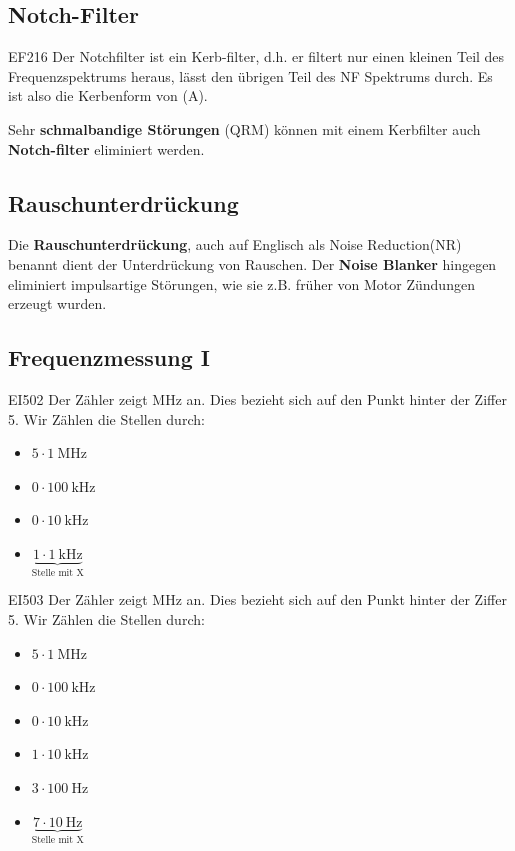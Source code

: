 \subsection{Notch-Filter}
\begin{sol}{EF216}
Der Notchfilter ist ein Kerb-filter, d.h. er filtert nur einen kleinen Teil des Frequenzspektrums heraus, lässt den übrigen Teil des NF Spektrums durch. Es ist also die Kerbenform von (A).
\end{sol} 
\begin{ohmchapter}
Sehr \textbf{schmalbandige Störungen} (QRM) können mit einem Kerbfilter auch \textbf{Notch-filter} eliminiert werden.
\end{ohmchapter}



\subsection{Rauschunterdrückung}
\begin{ohmchapter}
  Die \textbf{Rauschunterdrückung}, auch auf Englisch als Noise Reduction(NR) benannt dient der Unterdrückung von Rauschen.
  Der \textbf{Noise Blanker} hingegen eliminiert impulsartige Störungen, wie sie z.B. früher von Motor Zündungen erzeugt wurden.
\end{ohmchapter}  


\subsection{Frequenzmessung I}


\begin{sol}{EI502}
Der Zähler zeigt MHz an. Dies bezieht sich auf den Punkt hinter der Ziffer 5.
Wir Zählen die Stellen durch:
\begin{itemize}
  \item $5 \cdot \SI{1} {\mega\hertz}$
  \item $0 \cdot \SI{100} {\kilo\hertz}$
  \item $0 \cdot \SI{10} {\kilo\hertz}$  
  \item  $\underbrace{1 \cdot \SI{1} {\kilo\hertz}}_{\text{Stelle mit X}}$
\end{itemize}
\end{sol} 

\begin{sol}{EI503}
Der Zähler zeigt MHz an. Dies bezieht sich auf den Punkt hinter der Ziffer 5.
Wir Zählen die Stellen durch:
\begin{itemize}
  \item $5 \cdot \SI{1} {\mega\hertz}$
  \item $0 \cdot \SI{100} {\kilo\hertz}$
  \item $0 \cdot \SI{10} {\kilo\hertz}$
  \item $1 \cdot \SI{10} {\kilo\hertz}$
  \item $3 \cdot \SI{100} {\hertz}$
  \item $\underbrace{7 \cdot \SI{10} {\hertz}}_{\text{Stelle mit X}}$
\end{itemize}
\end{sol} 

